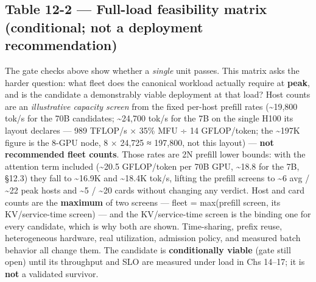 \subsection{Table 12-2 --- Full-load feasibility matrix (conditional;
not a deployment
recommendation)}\label{table-12-2-full-load-feasibility-matrix-conditional-not-a-deployment-recommendation}

The gate checks above show whether a \emph{single} unit passes. This
matrix asks the harder question: what fleet does the canonical workload
actually require at \textbf{peak}, and is the candidate a demonstrably
viable deployment at that load? Host counts are an \emph{illustrative
capacity screen} from the fixed per-host prefill rates
(\textasciitilde19,800 tok/s for the 70B candidates;
\textasciitilde24,700 tok/s for the 7B on the single H100 its layout
declares --- 989 TFLOP/s × 35\% MFU ÷ 14 GFLOP/token; the
\textasciitilde197K figure is the 8-GPU node, 8 × 24,725 ≈ 197,800, not
this layout) --- \textbf{not recommended fleet counts}. Those rates are
2N prefill lower bounds: with the attention term included
(\textasciitilde20.5 GFLOP/token per 70B GPU, \textasciitilde18.8 for
the 7B, §12.3) they fall to \textasciitilde16.9K and
\textasciitilde18.4K tok/s, lifting the prefill screens to
\textasciitilde6 avg / \textasciitilde22 peak hosts and \textasciitilde5
/ \textasciitilde20 cards without changing any verdict. Host and card
counts are the \textbf{maximum} of two screens --- fleet = max(prefill
screen, its KV/service-time screen) --- and the KV/service-time screen
is the binding one for every candidate, which is why both are shown.
Time-sharing, prefix reuse, heterogeneous hardware, real utilization,
admission policy, and measured batch behavior all change them. The
candidate is \textbf{conditionally viable} (gate still open) until its
throughput and SLO are measured under load in Chs 14--17; it is
\textbf{not} a validated survivor.


